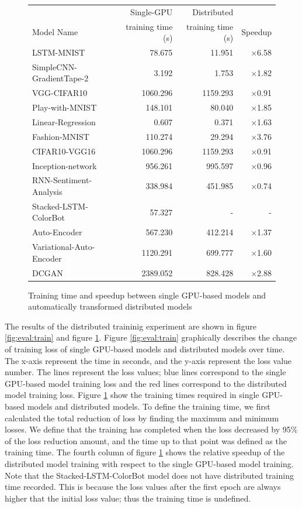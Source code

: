 \begin{figure}
  \centering
  \begin{tabular}{|l|r|r|r|}
\hline
                         & Single-GPU         & Distributed       & \\
Model Name               &  training time (s) & training time (s) &  Speedup\\
\hline
LSTM-MNIST               & 78.675& 11.951& $\times$6.58\\
SimpleCNN-GradientTape-2 & 3.192& 1.753& $\times$1.82\\
VGG-CIFAR10              & 1060.296  & 1159.293  &$\times$0.91   \\
Play-with-MNIST          & 148.101& 80.040& $\times$1.85\\
Linear-Regression        & 0.607& 0.371& $\times$1.63\\
Fashion-MNIST            & 110.274& 29.294& $\times$3.76\\
CIFAR10-VGG16            & 1060.296& 1159.293& $\times$0.91\\
Inception-network        & 956.261& 995.597& $\times$0.96\\
RNN-Sentiment-Analysis   & 338.984& 451.985& $\times$0.74\\
Stacked-LSTM-ColorBot    & 57.327 & -           & -   \\
Auto-Encoder             & 567.230& 412.214& $\times$1.37\\
Variational-Auto-Encoder & 1120.291& 699.777& $\times$1.60\\
DCGAN                    & 2389.052& 828.428& $\times$2.88\\ 
\hline
  \end{tabular}
  \caption{Training time and speedup between single GPU-based models and automatically transformed distributed models}
  \label{fig:eval:traintime}
\end{figure}

The results of the distributed traininig experiment 
are shown in figure \ref{fig:eval:train} and figure \ref{fig:eval:traintime}.
Figure \ref{fig:eval:train} graphically describes the change of training loss
of single GPU-based models and distributed models over time.
The x-axis represent the time in seconds, and the y-axis represent
the loss value number.
The lines represent the loss values;
blue lines correspond to the single GPU-based model training loss
and the red lines correspond to the distributed model training loss.
Figure \ref{fig:eval:traintime} show the training times required in
single GPU-based models and distributed models.
To define the training time, we first calculated the total reduction of
loss by finding the maximum and minimum losses.
We define that the training has completed when the loss decreased by
95\% of the loss reduction amount, and the time up to that point
was defined as the training time.
The fourth column of figure \ref{fig:eval:traintime} 
shows the relative speedup of the 
distributed model training with respect to the single GPU-based model training.
Note that the Stacked-LSTM-ColorBot model does not have distributed training
time recorded. This is because the loss values after the first epoch
are always higher that the initial loss value; thus the training time is
undefined.

